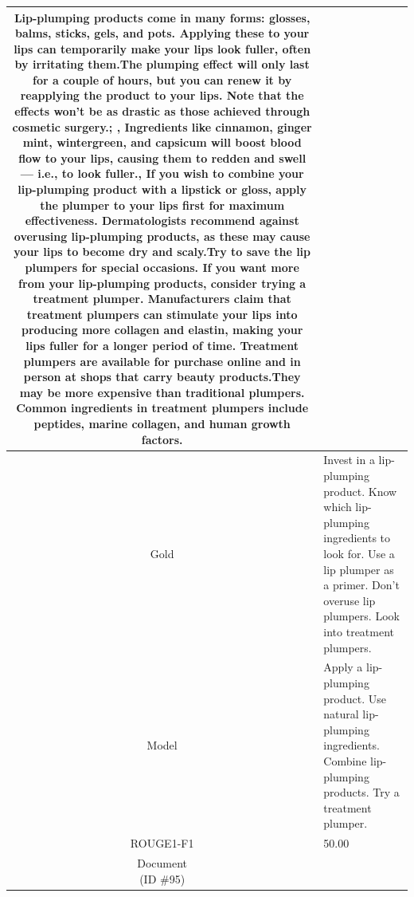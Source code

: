 \begin{table}[bth!]
\begin{tabular}{c|p{}}
Lip-plumping products come in many forms: glosses, balms, sticks, gels, and pots. Applying these to your lips can temporarily make your lips look fuller, often by irritating them.The plumping effect will only last for a couple of hours, but you can renew it by reapplying the product to your lips. Note that the effects won’t be as drastic as those achieved through cosmetic surgery.; , Ingredients like cinnamon, ginger mint, wintergreen, and capsicum will boost blood flow to your lips, causing them to redden and swell — i.e., to look fuller., If you wish to combine your lip-plumping product with a lipstick or gloss, apply the plumper to your lips first for maximum effectiveness. Dermatologists recommend against overusing lip-plumping products, as these may cause your lips to become dry and scaly.Try to save the lip plumpers for special occasions. If you want more from your lip-plumping products, consider trying a treatment plumper. Manufacturers claim that treatment plumpers can stimulate your lips into producing more collagen and elastin, making your lips fuller for a longer period of time. Treatment plumpers are available for purchase online and in person at shops that carry beauty products.They may be more expensive than traditional plumpers. Common ingredients in treatment plumpers include peptides, marine collagen, and human growth factors.
\\ \hline
Gold & 
Invest in a lip-plumping product. Know which lip-plumping ingredients to look for. Use a lip plumper as a primer. Don’t overuse lip plumpers. Look into treatment plumpers.
\\ \hline
Model & 
Apply a lip-plumping product. Use natural lip-plumping ingredients. Combine lip-plumping products. Try a treatment plumper.
\\ \hline
ROUGE1-F1 & 
50.00
\\ \hline
\makecell{Document\\(ID \#95)} & 

\end{tabular}
\end{table}
